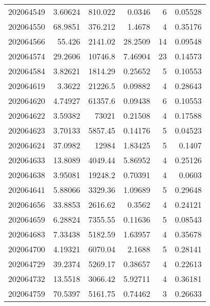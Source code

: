 \begin{tabular}{rrrrrr}
 202064549 &          3.60624 &      810.022  &            0.0346  &           6 & 0.05528 \\
 202064550 &         68.9851  &      376.212  &            1.4678  &           4 & 0.35176 \\
 202064566 &         55.426   &     2141.02   &           28.2509  &          14 & 0.09548 \\
 202064574 &         29.2606  &    10746.8    &            7.46904 &          23 & 0.14573 \\
 202064584 &          3.82621 &     1814.29   &            0.25652 &           5 & 0.10553 \\
 202064619 &          3.3622  &    21226.5    &            0.09882 &           4 & 0.28643 \\
 202064620 &          4.74927 &    61357.6    &            0.09438 &           6 & 0.10553 \\
 202064622 &          3.59382 &    73021      &            0.21508 &           4 & 0.17588 \\
 202064623 &          3.70133 &     5857.45   &            0.14176 &           5 & 0.04523 \\
 202064624 &         37.0982  &    12984      &            1.83425 &           5 & 0.1407  \\
 202064633 &         13.8089  &     4049.44   &            5.86952 &           4 & 0.25126 \\
 202064638 &          3.95081 &    19248.2    &            0.70391 &           4 & 0.0603  \\
 202064641 &          5.88066 &     3329.36   &            1.09689 &           5 & 0.29648 \\
 202064656 &         33.8853  &     2616.62   &            0.3562  &           4 & 0.24121 \\
 202064659 &          6.28824 &     7355.55   &            0.11636 &           5 & 0.08543 \\
 202064683 &          7.33438 &     5182.59   &            1.63957 &           4 & 0.35678 \\
 202064700 &          4.19321 &     6070.04   &            2.1688  &           5 & 0.28141 \\
 202064729 &         39.2374  &     5269.17   &            0.38657 &           4 & 0.22613 \\
 202064732 &         13.5518  &     3066.42   &            5.92711 &           4 & 0.36181 \\
 202064759 &         70.5397  &     5161.75   &            0.74462 &           3 & 0.26633 \\

\end{tabular}
